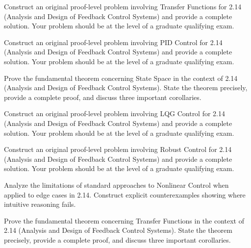 \documentclass[12pt,a4paper]{exam}
\begin{document}
\begin{questions}

\question[4]
Construct an original proof-level problem involving Transfer Functions for 2.14 (Analysis and Design of Feedback Control Systems) and provide a complete solution. Your problem should be at the level of a graduate qualifying exam.

\vspace{0.3cm}

\question[4]
Construct an original proof-level problem involving PID Control for 2.14 (Analysis and Design of Feedback Control Systems) and provide a complete solution. Your problem should be at the level of a graduate qualifying exam.

\vspace{0.3cm}

\question[4]
Prove the fundamental theorem concerning State Space in the context of 2.14 (Analysis and Design of Feedback Control Systems). State the theorem precisely, provide a complete proof, and discuss three important corollaries.

\vspace{0.3cm}

\question[6]
Construct an original proof-level problem involving LQG Control for 2.14 (Analysis and Design of Feedback Control Systems) and provide a complete solution. Your problem should be at the level of a graduate qualifying exam.

\vspace{0.3cm}

\question[4]
Construct an original proof-level problem involving Robust Control for 2.14 (Analysis and Design of Feedback Control Systems) and provide a complete solution. Your problem should be at the level of a graduate qualifying exam.

\vspace{0.3cm}

\question[3]
Analyze the limitations of standard approaches to Nonlinear Control when applied to edge cases in 2.14. Construct explicit counterexamples showing where intuitive reasoning fails.

\vspace{0.3cm}

\question[3]
Prove the fundamental theorem concerning Transfer Functions in the context of 2.14 (Analysis and Design of Feedback Control Systems). State the theorem precisely, provide a complete proof, and discuss three important corollaries.

\vspace{0.3cm}


\end{questions}
\end{document}

